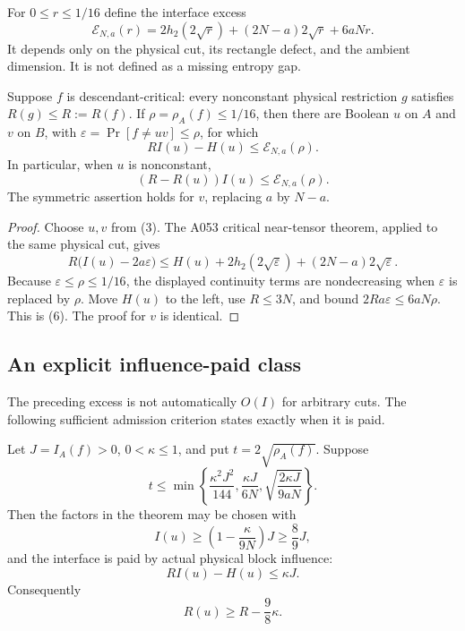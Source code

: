 For $0\le r\le1/16$ define the interface excess
\[
 \mathcal E_{N,a}(r)
 =2h_2(2\sqrt r)+(2N-a)2\sqrt r+6aNr.                \tag{5}
\]
It depends only on the physical cut, its rectangle defect, and the ambient
dimension.  It is not defined as a missing entropy gap.

\begin{theorem}
Suppose $f$ is descendant-critical: every nonconstant physical restriction
$g$ satisfies $R(g)\le R:=R(f)$.  If $\rho=\rho_A(f)\le1/16$, then there are
Boolean $u$ on $A$ and $v$ on $B$, with
$\varepsilon=\Pr[f\ne uv]\le\rho$, for which
\[
 \boxed{\quad R I(u)-H(u)\le\mathcal E_{N,a}(\rho).\quad}    \tag{6}
\]
In particular, when $u$ is nonconstant,
\[
 (R-R(u))I(u)\le\mathcal E_{N,a}(\rho).              \tag{7}
\]
The symmetric assertion holds for $v$, replacing $a$ by $N-a$.
\end{theorem}

\begin{proof}
Choose $u,v$ from (3).  The A053 critical near-tensor theorem, applied to the
same physical cut, gives
\[
 R\bigl(I(u)-2a\varepsilon\bigr)
 \le H(u)+2h_2(2\sqrt\varepsilon)
             +(2N-a)2\sqrt\varepsilon.               \tag{8}
\]
Because $\varepsilon\le\rho\le1/16$, the displayed continuity terms are
nondecreasing when $\varepsilon$ is replaced by $\rho$.  Move $H(u)$ to the
left, use $R\le3N$, and bound
$2Ra\varepsilon\le6aN\rho$.  This is (6).  The proof for $v$ is identical.
\end{proof}

\subsection*{An explicit influence-paid class}

The preceding excess is not automatically $O(I)$ for arbitrary cuts.  The
following sufficient admission criterion states exactly when it is paid.

\begin{corollary}
Let $J=I_A(f)>0$, $0<\kappa\le1$, and put $t=2\sqrt{\rho_A(f)}$.  Suppose
\[
 t\le\min\left\{
 \frac{\kappa^2J^2}{144},
 \frac{\kappa J}{6N},
 \sqrt{\frac{2\kappa J}{9aN}}
 \right\}.                                           \tag{9}
\]
Then the factors in the theorem may be chosen with
\[
 I(u)\ge\left(1-\frac{\kappa}{9N}\right)J\ge\frac89J, \tag{10}
\]
and the interface is paid by actual physical block influence:
\[
 R I(u)-H(u)\le\kappa J.                              \tag{11}
\]
Consequently
\[
 R(u)\ge R-\frac98\kappa.                            \tag{12}
\]
\end{corollary}


